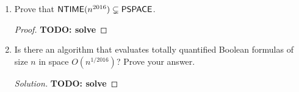 \documentclass[usletter]{article}
\newcommand {\langset}[1]      {\ensuremath{\mathcal{#1}}}
\newcommand {\machine}[1]      {\ensuremath{\mathscr{#1}}}
\newcommand {\langfunc}        {\ensuremath{\mathfrak{L}}}
\newcommand {\namedlangset}[1] {\ensuremath{\textnormal{\textsc{#1}}}}
\newcommand {\family}[1]       {\ensuremath{\textnormal{\textsf{#1}}}}
\newcommand {\indpar}[1]   {
  \par\leftskip=#1em
  \noindent\ignorespaces
}
\newenvironment{turing}[2] {
  \smallskip
  \indpar{2}
  \textbf{Machine:} #1\\
  \textbf{Input:} $#2$\\[5pt]
  \textbf{begin}
  \parskip=0pt
  \indpar{3}
}{
  \indpar{2}
  \textbf{end}
  \par\medskip
}
\newcommand{\todo}[1]{{\large \textbf{TODO: #1}}}
\newcommand {\langL}          {\langset{L}}
\newcommand {\machineM}       {\machine{M}}
\begin{document}
\begin{enumerate}
\begin{proof}
\begin{proof}
      Then following TM equipped with oracle \namedlangset{TQBF} would be able
      to decide \langL:
      \begin{turing}{$\machineM_\langL^\namedlangset{TQBF}$}{x}
        apply the polynomial time transformation
          $p_\langL^\namedlangset{TQBF}(x)$ resulting in $y$ \\
        \texttt{query} oracle \namedlangset{TQBF} for $y$ \\
        return the result from the oracle
      \end{turing}
      Clearly,
      $\forall \langL \in \family{PSPACE} :
        \langL = \langfunc(\machineM_\langL^\namedlangset{TQBF})
        \wedge \langfunc(\machineM_\langL^\namedlangset{TQBF})
          \in \family{P}^\namedlangset{TQBF}$.

      Thus, $\family{PSPACE} \subseteq \family{P}^\namedlangset{TQBF}$.
    \end{proof}

    \begin{claim}
      $ \family{NP}^\namedlangset{TQBF} \subseteq \family{NPSPACE} $.
    \end{claim}
    \begin{proof}
      By definition a TM in \family{NP}, uses at most polynomial amount of space
      and thus $\family{NP} \subseteq \family{NPSPACE}$. \\
      We also know that $\namedlangset{TQBF} \in \family{PSPACE}$. So we can
      encode the TM for \namedlangset{TQBF} into our non-deterministic TM,
      instead of using it as an oracle, and we would still use polynomial amount
      of space (if we re-use the same cells for computations every time we
      invoke this TM). \\
      Thus, instead of relativizing if we simply embed the TM for \family{TQBF},
      we have a non-deterministic TM with the same language which still in
      polynomial space.
    \end{proof}

    Therefore, we have
    $\family{PSPACE} \subseteq \family{P}^\namedlangset{TQBF}
                     \subseteq \family{NP}^\namedlangset{TQBF}
                     \subseteq \family{NPSPACE}
                     \subseteq \family{PSPACE}$
    (the last containment is due to Savitch's Theorem);
    from which it follows immediately that
    $\family{P}^\namedlangset{TQBF} = \family{NP}^\namedlangset{TQBF}$.
  \end{proof}

  \item Prove that $\family{NTIME}(n^{2016}) \subsetneq \family{PSPACE}$.
  \begin{proof}
    \todo{solve}
  \end{proof}

  \item Is there an algorithm that evaluates totally quantified Boolean formulas
        of size $n$ in space $O(n^{1/2016})$? Prove your answer.
  \begin{proof}[Solution]
    \todo{solve}
  \end{proof}
\end{enumerate}



\end{document}
